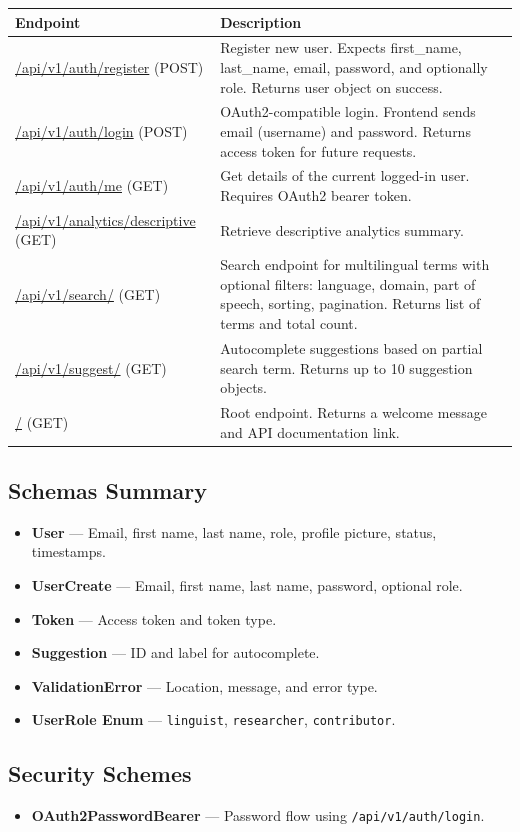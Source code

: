 \documentclass[12pt]{article}
\begin{document}
\begin{longtable}{|>{\raggedright\arraybackslash}p{4cm}|>{\raggedright\arraybackslash}p{9cm}|}
\hline
\textbf{Endpoint} & \textbf{Description} \\
\hline
\endhead

\url{/api/v1/auth/register} (POST) & Register new user. Expects first\_name, last\_name, email, password, and optionally role. Returns user object on success. \\
\hline

\url{/api/v1/auth/login} (POST) & OAuth2-compatible login. Frontend sends email (username) and password. Returns access token for future requests. \\
\hline

\url{/api/v1/auth/me} (GET) & Get details of the current logged-in user. Requires OAuth2 bearer token. \\
\hline

\url{/api/v1/analytics/descriptive} (GET) & Retrieve descriptive analytics summary. \\
\hline

\url{/api/v1/search/} (GET) & Search endpoint for multilingual terms with optional filters: language, domain, part of speech, sorting, pagination. Returns list of terms and total count. \\
\hline

\url{/api/v1/suggest/} (GET) & Autocomplete suggestions based on partial search term. Returns up to 10 suggestion objects. \\
\hline

\url{/} (GET) & Root endpoint. Returns a welcome message and API documentation link. \\
\hline
\end{longtable}

\subsection{Schemas Summary}
\begin{itemize}
    \item \textbf{User} — Email, first name, last name, role, profile picture, status, timestamps.
    \item \textbf{UserCreate} — Email, first name, last name, password, optional role.
    \item \textbf{Token} — Access token and token type.
    \item \textbf{Suggestion} — ID and label for autocomplete.
    \item \textbf{ValidationError} — Location, message, and error type.
    \item \textbf{UserRole Enum} — \texttt{linguist}, \texttt{researcher}, \texttt{contributor}.
\end{itemize}

\subsection{Security Schemes}
\begin{itemize}
    \item \textbf{OAuth2PasswordBearer} — Password flow using \texttt{/api/v1/auth/login}.
\end{itemize}
\end{document}
